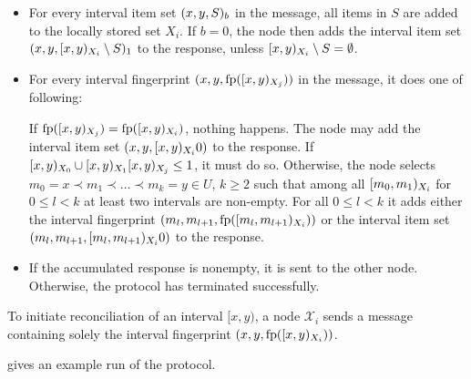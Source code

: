 \begin{itemize}
  \item For every interval item set $({x}, {y}, {S})_{b}$ in the message, all items in $S$ are added to the locally stored set $X_i$. If $b = 0$, the node then adds the interval item set $({x}, {y}, {[{x},{y})_{X_i} \setminus S})_{1}$ to the response, unless $[{x},{y})_{X_i} \setminus S = \emptyset$.
  \item For every interval fingerprint $({x}, {y}, {\operatorname{fp}([{x},{y})_{X_j})})$ in the message, it does one of following:
    \begin{caselist}
       \label{def-fingerprint-eq} If $\operatorname{fp}([{x},{y})_{X_j}) = \operatorname{fp}([{x},{y})_{X_i})$, nothing happens.
       \label{def-recursion-anchor} The node may add the interval item set $({x}, {y}, [{x},{y})_{X_i}{0})$ to the response. If $[{x},{y})_{X_0} \cup [{x},{y})_{X_1}{[{x},{y})_{X_j}} \leq 1$, it must do so.
      \case[Recurse] \label{def-recurse} Otherwise, the node selects $m_0 = x \prec m_1 \prec \ldots \prec m_k = y \in U$, $k \geq 2$ such that among all $[{m_0},{m_1})_{X_i}$ for  $0 \leq l < k$ at least two intervals are non-empty. For all $0 \leq l < k$ it adds either the interval fingerprint $({m_l}, {m_{l + 1}}, {\operatorname{fp}([{m_l},{m_{l + 1}})_{X_i})})$ or the interval item set $({m_l}, {m_{l + 1}}, [{m_l},{m_{l + 1}})_{X_i}{0})$ to the response.
    \end{caselist}
  \item If the accumulated response is nonempty, it is sent to the other node. Otherwise, the protocol has terminated successfully.
\end{itemize}

To initiate reconciliation of an interval $[x, y)$, a node $\mathcal{X}_i$ sends a message containing solely the interval fingerprint $({x}, {y}, {\operatorname{fp}([{x},{y})_{X_i})})$.

 gives an example run of the protocol.


